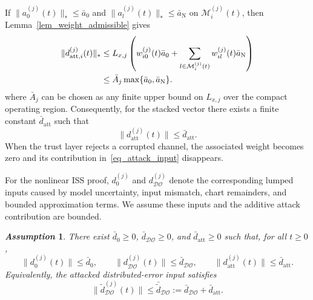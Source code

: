 \documentclass[journal,twoside]{IEEEtran}
\def\DO{\mathcal{DO}} %
\newtheorem{assumption}{\it Assumption}%
\begin{document}
If $\|a_{0}^{(j)}(t)\|_*\le \bar a_0$ and $\|a_{l}^{(j)}(t)\|_*\le \bar a_{\mathrm{N}}$ on $\mathcal{M}_{i}^{(j)}(t)$, then Lemma~\ref{lem_weight_admissible} gives
\begin{align}
\|d_{\mathrm{att},i}^{(j)}(t)\|_*
&\le L_{x,j}
\left(
w_{i0}^{(j)}(t)\bar a_0
+\sum_{l\in\mathcal{M}_{i}^{(j)}(t)}
w_{il}^{(j)}(t)\bar a_{\mathrm{N}}
\right) \notag\\
&\le \bar A_j \max\{\bar a_0,\bar a_{\mathrm{N}}\}.
\label{eq_attack_bound}
\end{align}
where $\bar A_j$ can be chosen as any finite upper bound on $L_{x,j}$ over the compact operating region. Consequently, for the stacked vector there exists a finite constant $\bar d_{\mathrm{att}}$ such that
\begin{equation}
    \|d_{\mathrm{att}}^{(j)}(t)\|\le \bar d_{\mathrm{att}}.
\end{equation}
When the trust layer rejects a corrupted channel, the associated weight becomes zero and its contribution in~\eqref{eq_attack_input} disappears.

For the nonlinear ISS proof, $d_0^{(j)}$ and $d_{\DO}^{(j)}$ denote the corresponding lumped inputs caused by model uncertainty, input mismatch, chart remainders, and bounded approximation terms. We assume these inputs and the additive attack contribution are bounded.
\begin{assumption}\label{assum_distur}
There exist $\bar{d}_{0} \geq 0$, $\bar{d}_{\DO} \geq 0$, and $\bar d_{\mathrm{att}}\ge0$ such that, for all $t\geq 0$,
\[
\|d_0^{(j)}(t)\| \le \bar{d}_{0},
\qquad
\|d_{\DO}^{(j)}(t)\| \le \bar{d}_{\DO},
\qquad
\|d_{\mathrm{att}}^{(j)}(t)\| \le \bar d_{\mathrm{att}}.
\]
Equivalently, the attacked distributed-error input satisfies
\[
    \|\tilde d_{\DO}^{(j)}(t)\|\le
    \bar{\tilde d}_{\DO}:=\bar d_{\DO}+\bar d_{\mathrm{att}}.
\]
\end{assumption}
\end{document}

